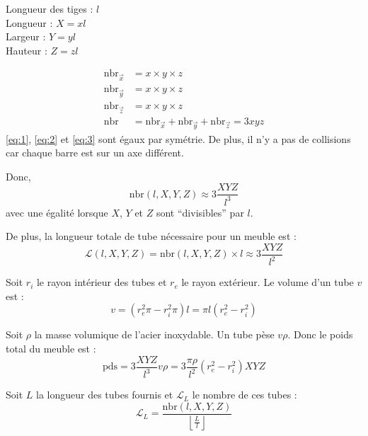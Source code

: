\documentclass[11pt, a4paper]{article}
\begin{document}
  \noindent Longueur des tiges : $l$\\
  Longueur : $X=xl$\\
  Largeur : $Y=yl$\\
  Hauteur : $Z=zl$


  \begin{align}
    \text{nbr}_{\vec{x}} &= x\times y \times z\label{eq:1}\\
    \text{nbr}_{\vec{y}} &= x\times y \times z\label{eq:2}\\
    \text{nbr}_{\vec{z}} &= x\times y \times z\label{eq:3}\\
    \text{nbr} &= \text{nbr}_{\vec{x}} + \text{nbr}_{\vec{y}} + \text{nbr}_{\vec{z}} = 3xyz
  \end{align}
  \eqref{eq:1}, \eqref{eq:2} et \eqref{eq:3} sont égaux par symétrie. De plus, il n'y a pas de collisions car chaque barre est sur un axe différent.

  Donc,
  \begin{equation}
    \text{nbr}(l, X, Y, Z) \approx 3\frac{XYZ}{l^3}
  \end{equation}
  avec une égalité lorsque $X$, $Y$ et $Z$ sont \enquote{divisibles} par $l$.

  De plus, la longueur totale de tube nécessaire pour un meuble est :
  \begin{equation}
    \mathcal{L}\left(l, X, Y, Z\right)=\text{nbr}(l, X, Y, Z)\times l \approx 3\frac{XYZ}{l^2}
  \end{equation}

  Soit $r_i$ le rayon intérieur des tubes et $r_e$ le rayon extérieur. Le volume d'un tube $v$ est :
  \begin{equation}
    v=\left( r_e^2\pi - r_i^2\pi \right)l = \pi l\left( r_e^2 - r_i^2 \right)
  \end{equation}

  Soit $\rho$ la masse volumique de l'acier inoxydable. Un tube pèse $v\rho$. Donc le poids total du meuble est :
  \begin{equation}
    \text{pds} = 3\frac{XYZ}{l^3}v\rho=3\frac{\pi\rho}{l^2}\left( r_e^2 - r_i^2 \right)XYZ
  \end{equation}

  Soit $L$ la longueur des tubes fournis et $\mathcal{L}_L$ le nombre de ces tubes :
  \begin{equation}
    \mathcal{L}_L = \frac{\text{nbr}\left( l, X, Y, Z \right)}{\left\lfloor \frac{L}{l} \right\rfloor}
  \end{equation}
\end{document}
